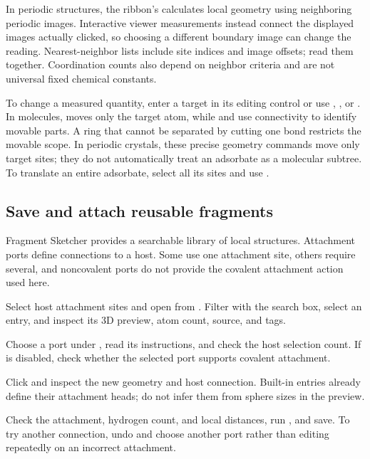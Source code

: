 In periodic structures, the ribbon's  calculates local geometry using neighboring periodic images. Interactive viewer measurements instead connect the displayed images actually clicked, so choosing a different boundary image can change the reading. Nearest-neighbor lists include site indices and image offsets; read them together. Coordination counts also depend on neighbor criteria and are not universal fixed chemical constants.

To change a measured quantity, enter a target in its editing control or use , , or . In molecules,  moves only the target atom, while  and  use connectivity to identify movable parts. A ring that cannot be separated by cutting one bond restricts the movable scope. In periodic crystals, these precise geometry commands move only target sites; they do not automatically treat an adsorbate as a molecular subtree. To translate an entire adsorbate, select all its sites and use .

\subsection{Save and attach reusable fragments}\label{sec:fragment-library-reference}

Fragment Sketcher provides a searchable library of local structures. Attachment ports define connections to a host. Some use one attachment site, others require several, and noncovalent ports do not provide the covalent attachment action used here.

\begin{steps}
  \item Select host attachment sites and open  from . Filter with the search box, select an entry, and inspect its 3D preview, atom count, source, and tags.
  \item Choose a port under , read its instructions, and check the host selection count. If  is disabled, check whether the selected port supports covalent attachment.
  \item Click  and inspect the new geometry and host connection. Built-in entries already define their attachment heads; do not infer them from sphere sizes in the preview.
  \item Check the attachment, hydrogen count, and local distances, run , and save. To try another connection, undo and choose another port rather than editing repeatedly on an incorrect attachment.
\end{steps}

